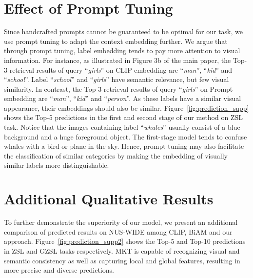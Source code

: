 \documentclass[letterpaper]{article} %
\begin{document}
\section{Effect of Prompt Tuning}
Since handcrafted prompts cannot be guaranteed to be optimal for our task, we use prompt tuning to adapt the context embedding further.
We argue that through prompt tuning, label embedding tends to pay more attention to visual information.
For instance, as illustrated in Figure 3b of the main paper, the Top-3 retrieval results of query ``\textit{girls}'' on CLIP embedding are ``\textit{man}'', ``\textit{kid}'' and ``\textit{school}''.
Label ``\textit{school}'' and ``\textit{girls}'' have semantic relevance, but few visual similarity.
In contrast, the Top-3 retrieval results of query ``\textit{girls}'' on Prompt embedding are ``\textit{man}'', ``\textit{kid}'' and ``\textit{person}''.
As these labels have a similar visual appearance, their embeddings should also be similar.
Figure~\ref{fig:prediction_supp} shows the Top-5 predictions in the first and second stage of our method on ZSL task.
Notice that the images containing label ``\textit{whales}'' usually consist of a blue background and a huge foreground object.
The first-stage model tends to confuse whales with a bird or plane in the sky.
Hence, prompt tuning may also facilitate the classification of similar categories by making the embedding of visually similar labels more distinguishable. 

\section{Additional Qualitative Results}
\label{section:Additional Qualitative Results}
To further demonstrate the superiority of our model, we present an additional comparison of predicted results on NUS-WIDE among CLIP, BiAM and our approach.
Figure~\ref{fig:prediction_supp2} shows the Top-5 and Top-10 predictions in ZSL and GZSL tasks respectively.
MKT is capable of recognizing visual and semantic consistency as well as capturing local and global features, resulting in more precise and diverse predictions.
\end{document}
